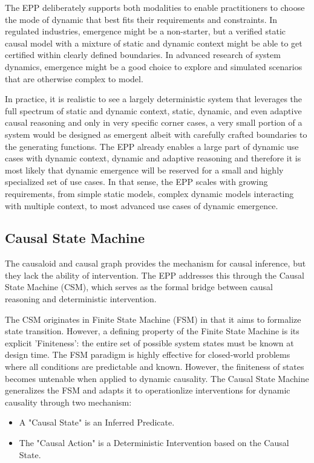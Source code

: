 The EPP deliberately supports both modalities to enable practitioners to choose the mode of dynamic that best fits their requirements and constraints. In regulated industries, emergence might be a non-starter, but a verified static causal model with a mixture of static and dynamic context might be able to get certified within clearly defined boundaries. In advanced research of system dynamics, emergence might be a good choice to explore and simulated scenarios that are otherwise complex to model. 

In practice, it is realistic to see a largely deterministic system that leverages the full spectrum of static and dynamic context, static, dynamic, and even adaptive causal reasoning and only in very specific corner cases, a very small portion of a system would be designed as emergent albeit with  carefully crafted boundaries to the generating functions. The EPP already enables a large part of dynamic use cases with dynamic context, dynamic and adaptive reasoning and therefore it is most likely that dynamic emergence will be reserved for a small and highly specialized set of use cases. In that sense, the EPP scales with growing requirements, from simple static models, complex dynamic models interacting with multiple context, to most advanced use cases of dynamic emergence. 

%
%
\subsection{Causal State Machine}
\label{sec:epp_csm}

The causaloid and causal graph provides the mechanism for causal inference, 
but they lack the ability of intervention. The EPP addresses this through the Causal State Machine (CSM), which serves as the formal bridge between causal reasoning and deterministic intervention.

The CSM originates in Finite State Machine (FSM) in that it aims to formalize state transition.
However, a defining property of the Finite State Machine is its explicit 'Finiteness': the entire set of possible system states must be known at design time. The FSM paradigm is highly effective for closed-world problems where all conditions are predictable and known. However, the finiteness of states becomes untenable when applied to dynamic causality. The Causal State Machine generalizes the FSM and adapts it 
to operationlize interventions for dynamic causality through two mechanism:
 
\begin{itemize}
	\item A "Causal State" is an Inferred Predicate. 
	\item The "Causal Action" is a Deterministic Intervention based on the  Causal State.
\end{itemize}

